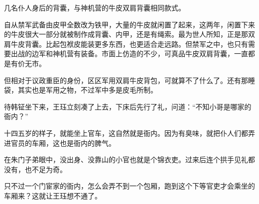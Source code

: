 几名仆人身后的背囊，与神机营的牛皮双肩背囊相同款式。

自从禁军武备由皮甲全数改为铁甲，大量的牛皮就闲置了起来，这两年，闲置下来的牛皮很大一部分就被制作成背囊、内甲，还是有绳索。最为世人所知，正是那双肩牛皮背囊。比起包袱皮能装更多东西，也更适合走远路。但禁军之中，也只有需要出战的边军和神机营有装备。市面上仿造的不少，可真品牛皮双肩背囊，一直都是有价无市。

但相对于议政重臣的身份，区区军用双肩牛皮背包，可就算不了什么了。还有那睡袋，其实也是军用之物，不过军中多是皮毛所制。

待韩钲坐下来，王珏立刻凑了上去，下床后先行了礼，问道：“不知小哥是哪家的衙内？”

十四五岁的样子，就能坐上官车，这自然就是衙内。因为有臭味，就把仆人们都弄进官员的车厢，这也是衙内的脾气。

在朱门子弟眼中，没出身、没靠山的小官也就是个锦衣吏。过来后连个拱手见礼都没有，也不足为奇。

只不过一个门宦家的衙内，怎么会弄不到一个包厢，跑到这个下等官吏才会乘坐的车厢来？这就让王珏想不通了。
